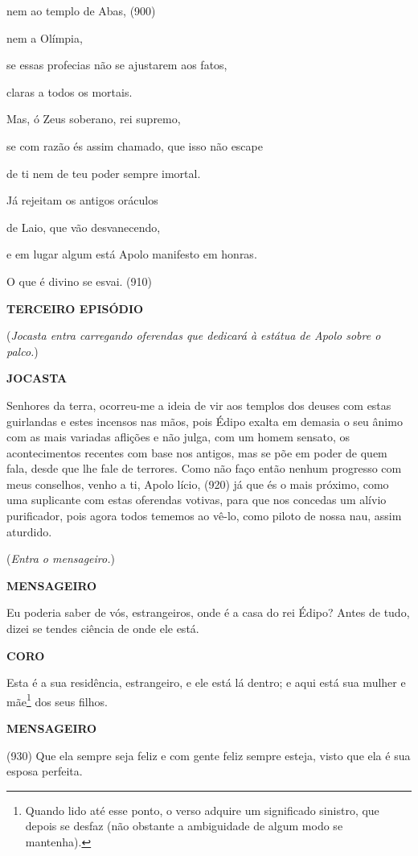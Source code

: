 nem ao templo de Abas, (900)

nem a Olímpia,

se essas profecias não se ajustarem aos fatos,

claras a todos os mortais.

Mas, ó Zeus soberano, rei supremo,

se com razão és assim chamado, que isso não escape

de ti nem de teu poder sempre imortal.

Já rejeitam os antigos oráculos

de Laio, que vão desvanecendo,

e em lugar algum está Apolo manifesto em honras.

O que é divino se esvai. (910)

\textbf{TERCEIRO EPISÓDIO}

(\emph{Jocasta entra carregando oferendas que dedicará à estátua de
Apolo sobre o palco.})

\textbf{JOCASTA}

Senhores da terra, ocorreu-me a ideia de vir aos templos dos deuses com
estas guirlandas e estes incensos nas mãos, pois Édipo exalta em demasia
o seu ânimo com as mais variadas aflições e não julga, com um homem
sensato, os acontecimentos recentes com base nos antigos, mas se põe em
poder de quem fala, desde que lhe fale de terrores. Como não faço então
nenhum progresso com meus conselhos, venho a ti, Apolo lício, (920) já
que és o mais próximo, como uma suplicante com estas oferendas votivas,
para que nos concedas um alívio purificador, pois agora todos tememos ao
vê-lo, como piloto de nossa nau, assim aturdido.

(\emph{Entra o mensageiro.})

\textbf{MENSAGEIRO}

Eu poderia saber de vós, estrangeiros, onde é a casa do rei Édipo? Antes
de tudo, dizei se tendes ciência de onde ele está.

\textbf{CORO}

Esta é a sua residência, estrangeiro, e ele está lá dentro; e aqui está
sua mulher e mãe\footnote{Quando lido até esse ponto, o verso adquire um
  significado sinistro, que depois se desfaz (não obstante a ambiguidade
  de algum modo se mantenha).} dos seus filhos.

\textbf{MENSAGEIRO}

(930) Que ela sempre seja feliz e com gente feliz sempre esteja, visto
que ela é sua esposa perfeita.

